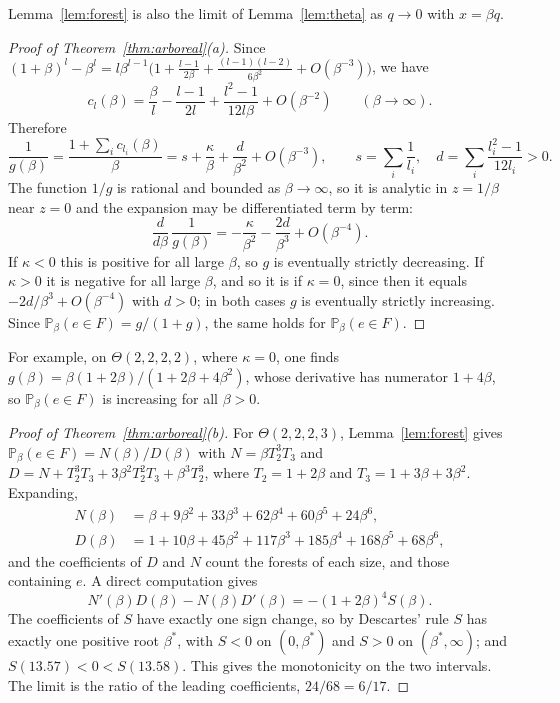 \documentclass[11pt]{amsart}
\theoremstyle{remark}
\numberwithin{equation}{section}
\newcommand{\Pp}{\mathbb P}
\begin{document}
Lemma~\ref{lem:forest} is also the limit of Lemma~\ref{lem:theta} as $q\to0$ with $x=\beta q$.

\begin{proof}[Proof of Theorem~\ref{thm:arboreal}\textup{(a)}]
Since $(1+\beta)^l-\beta^l=l\beta^{l-1}\bigl(1+\frac{l-1}{2\beta}+\frac{(l-1)(l-2)}{6\beta^2}+O(\beta^{-3})\bigr)$, we have
\[
 c_l(\beta)=\frac\beta l-\frac{l-1}{2l}+\frac{l^2-1}{12l\beta}+O(\beta^{-2})\qquad(\beta\to\infty).
\]
Therefore
\[
 \frac1{g(\beta)}=\frac{1+\sum_ic_{l_i}(\beta)}{\beta}=s+\frac\kappa\beta+\frac d{\beta^2}+O(\beta^{-3}),\qquad s=\sum_i\frac1{l_i},\quad d=\sum_i\frac{l_i^2-1}{12l_i}>0.
\]
The function $1/g$ is rational and bounded as $\beta\to\infty$, so it is analytic in $z=1/\beta$ near $z=0$ and the expansion may be differentiated term by term:
\[
 \frac{d}{d\beta}\,\frac1{g(\beta)}=-\frac\kappa{\beta^2}-\frac{2d}{\beta^3}+O(\beta^{-4}).
\]
If $\kappa<0$ this is positive for all large $\beta$, so $g$ is eventually strictly decreasing. If $\kappa>0$ it is negative for all large $\beta$, and so it is if $\kappa=0$, since then it equals $-2d/\beta^3+O(\beta^{-4})$ with $d>0$; in both cases $g$ is eventually strictly increasing. Since $\Pp_\beta(e\in F)=g/(1+g)$, the same holds for $\Pp_\beta(e\in F)$.
\end{proof}

For example, on $\Theta(2,2,2,2)$, where $\kappa=0$, one finds $g(\beta)=\beta(1+2\beta)/(1+2\beta+4\beta^2)$, whose derivative has numerator $1+4\beta$, so $\Pp_\beta(e\in F)$ is increasing for all $\beta>0$.

\begin{proof}[Proof of Theorem~\ref{thm:arboreal}\textup{(b)}]
For $\Theta(2,2,2,3)$, Lemma~\ref{lem:forest} gives $\Pp_\beta(e\in F)=N(\beta)/D(\beta)$ with $N=\beta T_2^3T_3$ and $D=N+T_2^3T_3+3\beta^2T_2^2T_3+\beta^3T_2^3$, where $T_2=1+2\beta$ and $T_3=1+3\beta+3\beta^2$. Expanding,
\begin{align*}
 N(\beta)&=\beta+9\beta^2+33\beta^3+62\beta^4+60\beta^5+24\beta^6,\\
 D(\beta)&=1+10\beta+45\beta^2+117\beta^3+185\beta^4+168\beta^5+68\beta^6,
\end{align*}
and the coefficients of $D$ and $N$ count the forests of each size, and those containing $e$. A direct computation gives
\[
 N'(\beta)D(\beta)-N(\beta)D'(\beta)=-(1+2\beta)^4S(\beta).
\]
The coefficients of $S$ have exactly one sign change, so by Descartes' rule $S$ has exactly one positive root $\beta^*$, with $S<0$ on $(0,\beta^*)$ and $S>0$ on $(\beta^*,\infty)$; and $S(13.57)<0<S(13.58)$. This gives the monotonicity on the two intervals. The limit is the ratio of the leading coefficients, $24/68=6/17$.
\end{proof}
\end{document}
